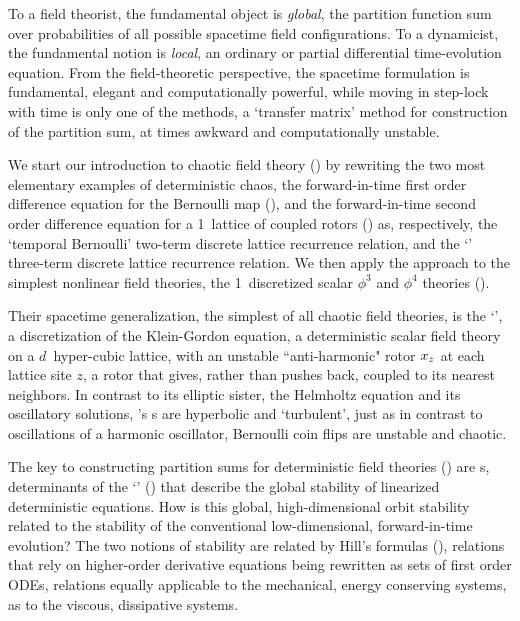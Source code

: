 To a field theorist, the fundamental object is \emph{global}, the
partition function sum over probabilities of all possible spacetime field
configurations.
To a dynamicist, the fundamental notion is \emph{local}, an ordinary or
partial differential time-evolution equation. From the field-theoretic
perspective, the spacetime formulation is fundamental, elegant and
computationally powerful, while moving in step-lock with time is only one
of the methods, a `transfer matrix' method for construction of the
partition sum, at times awkward and computationally unstable.

We start our introduction to chaotic field theory () by
rewriting the two most elementary examples of deterministic chaos,
the for\-ward-in-time first order difference equation for the Bernoulli
map (), and
the for\-ward-in-time second order difference equation for a 1\dmn\
lattice of coupled rotors () as, respectively,
the `{temporal Bernoulli}' two-term discrete lattice recurrence relation,
and
the `\templatt'  three-term discrete lattice recurrence relation.
We then apply the approach to the simplest
nonlinear field theories, the 1\dmn\ discretized
scalar {$\phi^3$} and {$\phi^4$} theories
().

Their spacetime generalization, the simplest of all chaotic field theories,
is the `\catlatt'\rf{GutOsi15,GHJSC16,CL18}, a discretization of the
Klein-Gordon equation, a deterministic scalar field theory on a $d$\dmn\
hyper-cubic lattice, with an unstable ``anti-harmonic" rotor $x_{z}$
at each lattice site $z$, a rotor that gives, rather than pushes back,
coupled to its nearest neighbors.
In contrast to its elliptic sister, the Helmholtz equation and its
oscillatory solutions, {\catlatt}'s {\lattstate}s are hyperbolic and
`turbulent', just as in contrast to oscillations of a harmonic
oscillator, Bernoulli coin flips are unstable and chaotic.

The key to constructing partition sums for deterministic field theories
() are {\HillDet}s, determinants of  the
`{\jacobianOrbs}' (\refsect{s:JacobianOrb}) that describe the global
stability of linearized deterministic equations.
How is this global, high-dimensional orbit stability related
to the stability of the conventional low-dimensional, forward-in-time evolution?
The two notions of stability are related by Hill's
formulas (\refsect{s:LC21Hill}), relations that rely on higher-order
derivative equations being rewritten as sets of first order ODEs,
relations equally applicable to the mechanical, energy conserving
systems, as to the viscous, dissipative systems.

